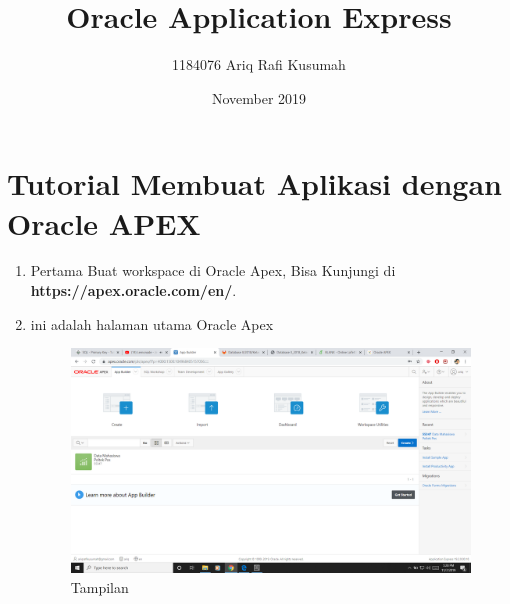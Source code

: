 \documentclass[12pt, times new roman]{article}
\title{Oracle Application Express}
\author{1184076 Ariq Rafi Kusumah}
\date{November 2019}
\begin{document}
\maketitle

\section{Tutorial Membuat Aplikasi dengan Oracle APEX}
\begin{enumerate}
\item Pertama Buat workspace di Oracle Apex, Bisa Kunjungi di \textbf{https://apex.oracle.com/en/}.
\item ini adalah halaman utama Oracle Apex
\begin{figure}[h]
	\centering
		\includegraphics[scale=0.2]{Gambar/Capture1}
	\caption{Tampilan}
\end{figure}


\end{enumerate}
\end{document}
